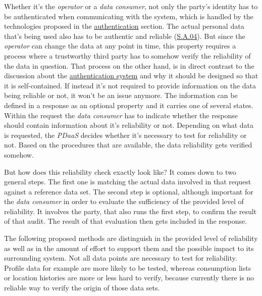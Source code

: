 \documentclass[12pt,english,a4paper,titlepage,cleardoublepage=empty,dottedtoc]{report}
\begin{document}
Whether it's the \emph{operator} or a \emph{data consumer}, not only the
party's identity has to be authenticated when communicating with the
system, which is handled by the technologies proposed in the
\protect\hyperlink{authentication}{authentication} section. The actual
personal data that's being used also has to be authentic and reliable
(\protect\hyperlink{sa04}{S.A.04}). But since the \emph{operator} can
change the data at any point in time, this property requires a process
where a trustworthy third party has to somehow verify the reliability of
the data in question. That process on the other hand, is in direct
contrast to the discussion about the
\protect\hyperlink{authentication}{authentication system} and why it
should be designed so that it is self-contained. If instead it's not
required to provide information on the data being reliable or not, it
won't be an issue anymore. The information can be defined in a response
as an optional property and it carries one of several states. Within the
request the \emph{data consumer} has to indicate whether the response
should contain information about it's reliability or not. Depending on
what data is requested, the \emph{PDaaS} decides whether it's necessary
to test for reliability or not. Based on the procedures that are
available, the data reliability gets verified somehow.

But how does this reliability check exactly look like? It comes down to
two general steps. The first one is matching the actual data involved in
that request against a reference data set. The second step is optional,
although important for the \emph{data consumer} in order to evaluate the
sufficiency of the provided level of reliability. It involves the party,
that also runs the first step, to confirm the result of that audit. The
result of that evaluation then gets included in the response.

The following proposed methods are distinguish in the provided level of
reliability as well as in the amount of effort to support them and the
possible impact to its surrounding system. Not all data points are
necessary to test for reliability. Profile data for example are more
likely to be tested, whereas consumption lists or location histories are
more or less hard to verify, because currently there is no reliable way
to verify the origin of those data sets.
\end{document}
